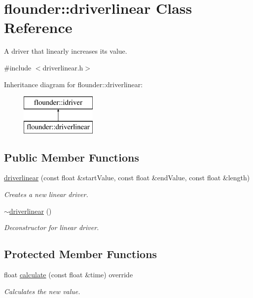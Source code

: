 \hypertarget{classflounder_1_1driverlinear}{}\section{flounder\+:\+:driverlinear Class Reference}
\label{classflounder_1_1driverlinear}


A driver that linearly increases its value.  




{\ttfamily \#include $<$driverlinear.\+h$>$}

Inheritance diagram for flounder\+:\+:driverlinear\+:\begin{figure}[H]
\begin{center}
\leavevmode
\includegraphics[height=2.000000cm]{classflounder_1_1driverlinear}
\end{center}
\end{figure}
\subsection*{Public Member Functions}
\begin{DoxyCompactItemize}
\item 
\hyperlink{classflounder_1_1driverlinear_a4644bdd0dc29e8e8129fbcd4fc2c57ed}{driverlinear} (const float \&start\+Value, const float \&end\+Value, const float \&length)
\begin{DoxyCompactList}\small\item\em Creates a new linear driver. \end{DoxyCompactList}\item 
\hyperlink{classflounder_1_1driverlinear_a792fa316601770f3d40a398618564bc6}{$\sim$driverlinear} ()
\begin{DoxyCompactList}\small\item\em Deconstructor for linear driver. \end{DoxyCompactList}\end{DoxyCompactItemize}
\subsection*{Protected Member Functions}
\begin{DoxyCompactItemize}
\item 
float \hyperlink{classflounder_1_1driverlinear_a7f645c05d7a8bdb555bbf70aca7c630e}{calculate} (const float \&time) override
\begin{DoxyCompactList}\small\item\em Calculates the new value. \end{DoxyCompactList}\end{DoxyCompactItemize}
